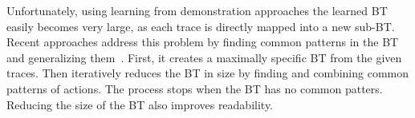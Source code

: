 Unfortunately, using learning from demonstration approaches the learned BT easily becomes  very large, as each trace is directly mapped into a new sub-BT. Recent approaches address this problem by finding common patterns in the BT and generalizing them~\cite{robertson2015building}.
First, it creates a maximally specific BT from the given traces. Then
iteratively reduces the BT in size by finding and combining common
patterns  of  actions.  The  process  stops when the BT has no common patters.    
Reducing  the  size  of  the  BT also improves readability.

%
%
%
%
%
%
%
%
%
%
%
%
%
%













\endinput